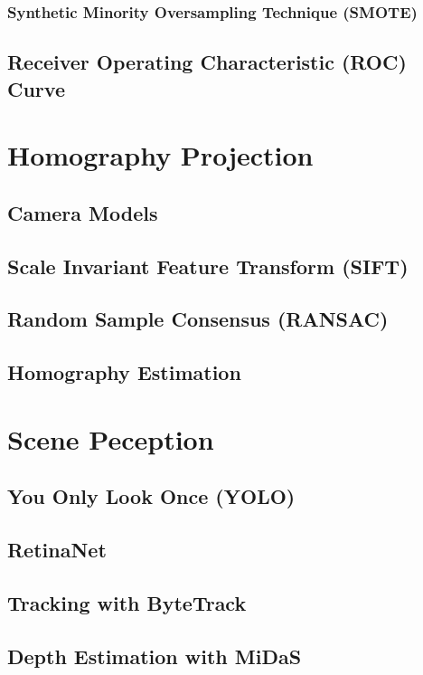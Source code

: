 \subsubsection{Synthetic Minority Oversampling Technique (SMOTE)}

\subsection{Receiver Operating Characteristic (ROC) Curve}


\section{Homography Projection}

\subsection{Camera Models}

\subsection{Scale Invariant Feature Transform (SIFT)}

\subsection{Random Sample Consensus (RANSAC)}

\subsection{Homography Estimation}


\section {Scene Peception}

\subsection {You Only Look Once (YOLO)}

\subsection{RetinaNet}

\subsection{Tracking with ByteTrack}

\subsection{Depth Estimation with MiDaS}